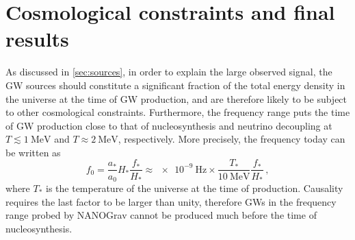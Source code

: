 \documentclass{article}
\begin{document}
\section{Cosmological constraints and final results}
\label{sec:results}

As discussed in \cref{sec:sources}, in order to explain the large observed signal, the GW sources should constitute a significant fraction of the total energy density in the universe at the time of GW production, and are therefore likely to be subject to other cosmological constraints. Furthermore, the frequency range puts the time of GW production close to that of nucleosynthesis and neutrino decoupling at $T\lesssim \SI{1}{\MeV}$ and $T\approx \SI{2}{\MeV}$, respectively. More precisely, the frequency today can be written as~\cite{Schwaller:2015tja}
%
\begin{equation}
    f_0 = \frac{a_*}{a_0} H_* \frac{f_*}{H_*} \approx \SI{e-9}{\Hz} \times \frac{T_*}{\SI{10}{\MeV}} \frac{f_*}{H_*}\,,
\end{equation}
%
where $T_*$ is the temperature of the universe at the time of production. 
Causality requires the last factor to be larger than unity, therefore GWs in the frequency range probed by NANOGrav cannot be produced much before the time of nucleosynthesis. 
\end{document}
